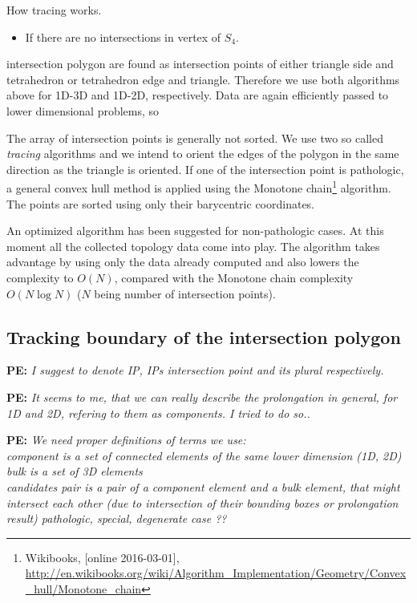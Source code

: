 \documentclass{elsarticle}
\newcommand{\notePE}[1]{{\color{Orange} \textbf{PE: } \textit{#1}}}
\begin{document}
How tracing works.
\begin{itemize}
 \item If there are no intersections in vertex of $S_4$. 
\end{itemize}

  
  



intersection polygon
are found as intersection points of either triangle side and tetrahedron or tetrahedron edge and triangle.
Therefore we use both algorithms above for 1D-3D and 1D-2D, respectively. Data are again efficiently passed
to lower dimensional problems, so 

The array of intersection points is generally not sorted. We use two so called \emph{tracing} algorithms and we
intend to orient the edges of the polygon in the same direction as the triangle is oriented.
If one of the intersection point is pathologic, a general convex hull method is applied using the Monotone 
chain\footnote{Wikibooks, [online 2016-03-01], 
      \url{http://en.wikibooks.org/wiki/Algorithm_Implementation/Geometry/Convex_hull/Monotone_chain}} 
algorithm. The points are sorted using only their barycentric coordinates.

An optimized algorithm has been suggested for non-pathologic cases. At this moment all the collected topology 
data come into play. The algorithm takes advantage by using only the data already computed and also lowers
the complexity to $O(N)$, compared with the Monotone chain complexity $O(N\log N)$ 
($N$ being number of intersection points).


\subsection{Tracking boundary of the intersection polygon}
\notePE{I suggest to denote IP, IPs intersection point and its plural respectively.}

\notePE{It seems to me, that we can really describe the prolongation in general, for 1D and 2D, 
refering to them as components. I tried to do so..}

\notePE{We need proper definitions of terms we use: \\
\emph{component} is a set of connected elements of the same lower dimension (1D, 2D)\\
\emph{bulk} is a set of 3D elements\\
\emph{candidates pair}  is a pair of a component element and a bulk element, that might intersect
each other (due to intersection of their bounding boxes or prolongation result)
\emph{pathologic, special, degenerate case ??}
}
\end{document}
